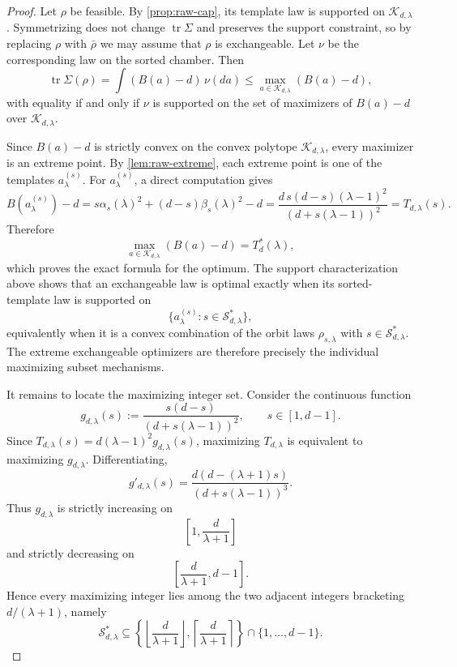 \documentclass[11pt]{amsart}
\theoremstyle{definition}
\DeclareMathOperator{\tr}{tr}
\newcommand{\cK}{\mathcal K}
\newcommand{\cS}{\mathcal S}
\begin{document}
\begin{proof}
Let $\rho$ be feasible. By \cref{prop:raw-cap}, its template law is supported on $\cK_{d,\lambda}$. Symmetrizing does not change $\tr\Sigma$ and preserves the support constraint, so by replacing $\rho$ with $\bar\rho$ we may assume that $\rho$ is exchangeable. Let $\nu$ be the corresponding law on the sorted chamber. Then
\[
\tr\Sigma(\rho)=\int (B(a)-d)\,\nu(da)\le \max_{a\in \cK_{d,\lambda}} (B(a)-d),
\]
with equality if and only if $\nu$ is supported on the set of maximizers of $B(a)-d$ over $\cK_{d,\lambda}$.

Since $B(a)-d$ is strictly convex on the convex polytope $\cK_{d,\lambda}$, every maximizer is an extreme point. By \cref{lem:raw-extreme}, each extreme point is one of the templates $a^{(s)}_\lambda$. For $a^{(s)}_\lambda$, a direct computation gives
\[
B(a^{(s)}_\lambda)-d
=
s\alpha_s(\lambda)^2+(d-s)\beta_s(\lambda)^2-d
=
\frac{d\,s(d-s)(\lambda-1)^2}{(d+s(\lambda-1))^2}
=
T_{d,\lambda}(s).
\]
Therefore
\[
\max_{a\in \cK_{d,\lambda}}(B(a)-d)=T_d^*(\lambda),
\]
which proves the exact formula for the optimum. The support characterization above shows that an exchangeable law is optimal exactly when its sorted-template law is supported on
\[
\{a^{(s)}_\lambda:s\in \cS_{d,\lambda}^*\},
\]
equivalently when it is a convex combination of the orbit laws $\rho_{s,\lambda}$ with $s\in \cS_{d,\lambda}^*$. The extreme exchangeable optimizers are therefore precisely the individual maximizing subset mechanisms.

It remains to locate the maximizing integer set. Consider the continuous function
\[
g_{d,\lambda}(s):=\frac{s(d-s)}{(d+s(\lambda-1))^2},
\qquad s\in [1,d-1].
\]
Since $T_{d,\lambda}(s)=d(\lambda-1)^2 g_{d,\lambda}(s)$, maximizing $T_{d,\lambda}$ is equivalent to maximizing $g_{d,\lambda}$. Differentiating,
\[
g'_{d,\lambda}(s)=\frac{d(d-(\lambda+1)s)}{(d+s(\lambda-1))^3}.
\]
Thus $g_{d,\lambda}$ is strictly increasing on
\[
\left[1,\frac{d}{\lambda+1}\right]
\]
and strictly decreasing on
\[
\left[\frac{d}{\lambda+1},d-1\right].
\]
Hence every maximizing integer lies among the two adjacent integers bracketing $d/(\lambda+1)$, namely
\[
\cS_{d,\lambda}^*\subseteq \left\{\left\lfloor \frac{d}{\lambda+1}\right\rfloor,\left\lceil \frac{d}{\lambda+1}\right\rceil\right\}\cap \{1,\dots,d-1\}.
\]
\end{proof}
\end{document}
